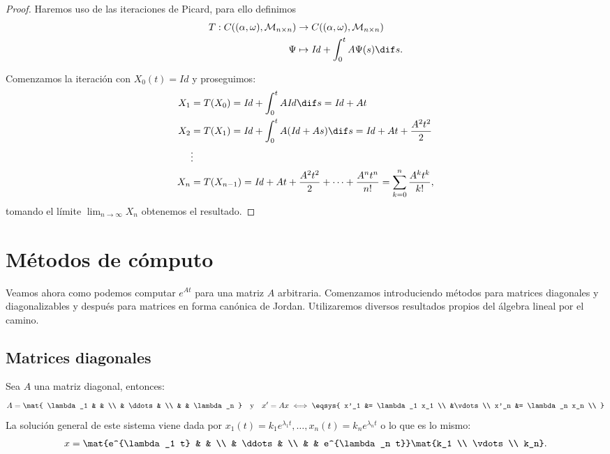 \documentclass[../ecuaciones_diferenciales.tex]{subfiles}
\begin{document}
\begin{proof}
	Haremos uso de las iteraciones de Picard, para ello definimos
	\begin{align*}
		T : C((\alpha, \omega), \mathcal{M}_{n \times n}) &\to 
			C((\alpha, \omega), \mathcal{M}_{n \times n}) \\
		\Psi &\mapsto \mathit{Id} + \int_0^t A \Psi(s) \dif s.
	\end{align*}

	Comenzamos la iteración con \(X_0(t) = \mathit{Id}\) y proseguimos:
	\begin{align*}
		X_1 &= T(X_0) = \mathit{Id} + \int_0^t A \mathit{Id} \dif s = 
			\mathit{Id} + At \\
		X_2 &= T(X_1) = \mathit{Id} + \int_0^t A (\mathit{Id} + As) \dif s = 
			\mathit{Id} + At + \frac{A^2 t^2}{2} \\
		&\vdots \\
		X_n &= T(X_{n - 1}) =
			\mathit{Id} + At + \frac{A^2 t^2}{2} + \cdots + \frac{A^n t^n}{n!}
			= \sum_{k = 0}^n \frac{A^k t^k}{k!},
	\end{align*}
	tomando el límite \(\lim_{n \to \infty} X_n\) obtenemos el resultado.
\end{proof}

\section{Métodos de cómputo}

Veamos ahora como podemos computar \(e^{At}\) para una matriz \(A\) arbitraria.
Comenzamos introduciendo métodos para matrices diagonales y diagonalizables y
después para matrices en forma canónica de Jordan. Utilizaremos diversos
resultados propios del álgebra lineal por el camino.

\subsection{Matrices diagonales}

Sea \(A\) una matriz diagonal, entonces:
\[A = \mat{
	\lambda_1 & & \\
	& \ddots & \\
	& & \lambda_n
	}
	\quad \text{y} \quad
	x' = Ax \iff
	\eqsys{
		x'_1 &= \lambda_1 x_1 \\
		&\vdots \\
		x'_n &= \lambda_n x_n \\
		}
	\]
La solución general de este sistema viene dada por 
\(x_1(t) = k_1 e^{\lambda_1 t}, \dots, x_n(t) = k_n e^{\lambda_n t}\) o lo que es
lo mismo:
\[x = \mat{e^{\lambda_1 t} & & \\ & \ddots & \\ & & e^{\lambda_n t}} 
	\mat{k_1 \\ \vdots \\ k_n}.\]
\end{document}
